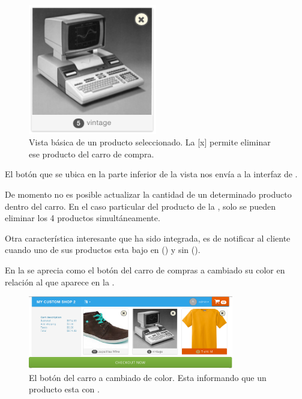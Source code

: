 		\begin{figure}[H]
			\centering
			\includegraphics[width=0.5\textwidth]{figuras/cart/ui/cart_item.png}
			\caption{Vista básica de un producto seleccionado. La [x] permite eliminar ese producto del carro de compra.}
			\label{figure:solution:cart:product}
		\end{figure}

		El botón \checkoutNowLABEL que se ubica en la parte inferior de la vista  nos envía a la interfaz de .

		De momento no es posible actualizar la cantidad de un determinado producto dentro del carro. En el caso particular del producto de la , solo se pueden eliminar los 4 productos simultáneamente.

		Otra característica interesante que ha sido integrada, es de notificar al cliente cuando uno de sus productos esta bajo en \stockEF (\limitedStockEF) y sin \stockEF (\limitedStockEF).

		En la  se aprecia como el botón del carro de compras a cambiado su color en relación al que aparece en la . 

		\begin{figure}[H]
			\centering
			\includegraphics[width=0.8\textwidth]{figuras/cart/ui/cart_icon_warning.png}
			\caption{El botón del carro a cambiado de color. Esta informando que un producto esta con \limitedStockEF.}
			\label{figure:cart:ui:cart_icon_warning}
		\end{figure}

